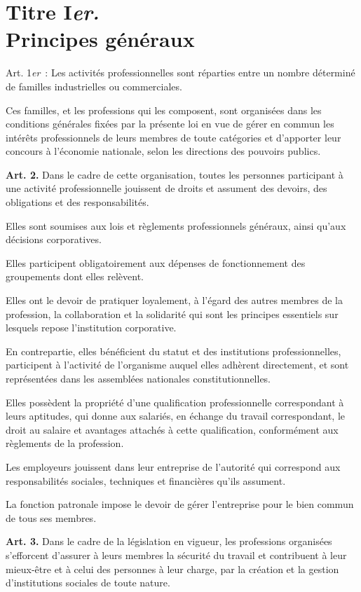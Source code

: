 \documentclass[french,twoside]{book} %
\newcommand{\labelchar}[1]{\textbf{\color{rubric} #1}}
\begin{document}
\section[Titre Ier. Principes généraux]{Titre I\emph{er.} \\
Principes généraux}
\noindent Art. 1\emph{er} : Les activités professionnelles sont réparties entre un nombre déterminé de familles industrielles ou commerciales.\par
Ces familles, et les professions qui les composent, sont organisées dans les conditions générales fixées par la présente loi en vue de gérer en commun les intérêts professionnels de leurs membres de toute catégories et d’apporter leur concours à l’économie nationale, selon les directions des pouvoirs publics.\par
\bigbreak
\noindent \labelchar{Art. 2.} Dans le cadre de cette organisation, toutes les personnes participant à une activité professionnelle jouissent de droits et assument des devoirs, des obligations et des responsabilités.\par
Elles sont soumises aux lois et règlements professionnels généraux, ainsi qu’aux décisions corporatives.\par
Elles participent obligatoirement aux dépenses de fonctionnement des groupements dont elles relèvent.\par
Elles ont le devoir de pratiquer loyalement, à l’égard des autres membres de la profession, la collaboration et la solidarité qui sont les principes essentiels sur lesquels repose l’institution corporative.\par
En contrepartie, elles bénéficient du statut et des institutions professionnelles, participent à l’activité de l’organisme auquel elles adhèrent directement, et sont représentées dans les assemblées nationales constitutionnelles.\par
Elles possèdent la propriété d’une qualification professionnelle correspondant à leurs aptitudes, qui donne aux salariés, en échange du travail correspondant, le droit au salaire et avantages attachés à cette qualification, conformément aux règlements de la profession.\par
Les employeurs jouissent dans leur entreprise de l’autorité qui correspond aux responsabilités sociales, techniques et financières qu’ils assument.\par
La fonction patronale impose le devoir de gérer l’entreprise pour le bien commun de tous ses membres.\par
\bigbreak
\noindent \labelchar{Art. 3.} Dans le cadre de la législation en vigueur, les professions organisées s’efforcent d’assurer à leurs membres la sécurité du travail et contribuent à leur mieux-être et à celui des personnes à leur charge, par la création et la gestion d’institutions sociales de toute nature.\par
\end{document}
